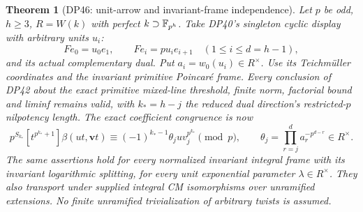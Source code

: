 \documentclass[11pt,a4paper]{article}
\newtheorem{theorem}{Theorem}[section]
\theoremstyle{definition}\newtheorem{remark}[theorem]{Remark}
\begin{document}
\begin{theorem}[DP46: unit-arrow and invariant-frame independence]\label{DP46}
Let $p$ be odd, $h\ge3$, $R=W(k)$ with perfect $k\supset\mathbb F_{p^h}$.
Take DP40's singleton cyclic display with arbitrary units $u_i$:
\[
 Fe_0=u_0e_1,\qquad Fe_i=pu_ie_{i+1}\quad(1\le i\le d=h-1),
\]
and its actual complementary dual. Put $a_i=w_0(u_i)\in R^\times$.
Use its Teichm\"uller coordinates and the invariant primitive Poincar\'e frame.
Every conclusion of DP42 about the exact primitive mixed-line threshold, finite norm, factorial bound and liminf remains valid, with
$k_*=h-j$ the reduced dual direction's restricted-$p$ nilpotency length.
The exact coefficient congruence is now
\[
 p^{S_{k_*}}[t^{p^{k_*}+1}]\beta(ut,\mathbf vt)
 \equiv(-1)^{k_*-1}\theta_j u v_j^{p^{k_*}}\pmod p,\qquad
 \theta_j=\prod_{r=j}^{d}a_r^{-p^{d-r}}\in R^\times.
\]
The same assertions hold for every normalized invariant integral frame with its invariant logarithmic splitting, for every unit exponential parameter $\lambda\in R^\times$.
They also transport under supplied integral CM isomorphisms over unramified extensions. No finite unramified trivialization of arbitrary twists is assumed.
\end{theorem}
\end{document}
